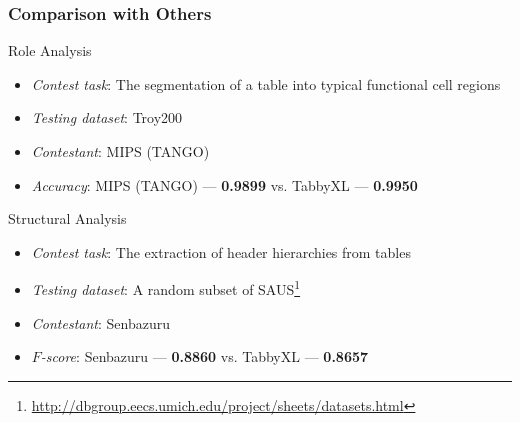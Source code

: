 \documentclass[10pt]{beamer}
\begin{document}

\begin{frame}
\frametitle{Comparison with Others}

\small{
\begin{block}{Role Analysis}
\begin{itemize}
\item \emph{Contest task}: The segmentation of a table into typical functional cell regions
\item \emph{Testing dataset}: Troy200  %
\item \emph{Contestant}: MIPS (TANGO) %
\item \emph{Accuracy}: MIPS (TANGO) --- \textbf{0.9899} vs. TabbyXL --- \textbf{0.9950}
\end{itemize}
\end{block}

\begin{block}{Structural Analysis}
\begin{itemize}
	\item \emph{Contest task}: The extraction of header hierarchies from tables
	\item \emph{Testing dataset}: A random subset of SAUS\footnote{\url{http://dbgroup.eecs.umich.edu/project/sheets/datasets.html}}
	\item \emph{Contestant}: Senbazuru %
	\item $F$\emph{-score}: Senbazuru --- \textbf{0.8860} vs. TabbyXL --- \textbf{0.8657}
\end{itemize}
\end{block}
}
\end{frame}
\end{document}
